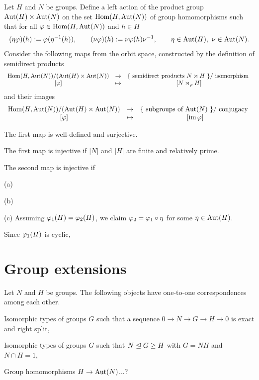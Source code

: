 \documentclass{../../large}
\begin{document}
\begin{prb}
Let $H$ and $N$ be groups.
Define a left action of the product group $\operatorname{Aut}(H)\times\operatorname{Aut}(N)$ on the set $\operatorname{Hom}(H,\operatorname{Aut}(N))$ of group homomorphisms such that for all $\varphi\in\operatorname{Hom}(H,\operatorname{Aut}(N))$ and $h\in H$
\[(\eta\varphi)(h):=\varphi(\eta^{-1}(h)),\qquad(\nu\varphi)(h):=\nu\varphi(h)\nu^{-1},\qquad \eta\in\operatorname{Aut}(H),\ \nu\in\operatorname{Aut}(N).\]
Consider the following maps from the orbit space, constructed by the definition of semidirect products
\[\begin{array}{ccc}
\operatorname{Hom}(H,\operatorname{Aut}(N))/(\operatorname{Aut}(H)\times\operatorname{Aut}(N))
&\to&
\{\text{ semidirect products $N\rtimes H$ }\}/\text{ isomorphism }\\
{[\varphi]}&\mapsto&{[N\rtimes_\varphi H]}
\end{array}\]
and their images
\[\begin{array}{ccc}
\operatorname{Hom}(H,\operatorname{Aut}(N))/(\operatorname{Aut}(H)\times\operatorname{Aut}(N))
&\to&
\{\text{ subgroups of $\operatorname{Aut}(N)$ }\}/\text{ conjugacy }\\
{[\varphi]}&\mapsto&{[\operatorname{im}\varphi]}
\end{array}\]
\begin{parts}
\item The first map is well-defined and surjective.
\item The first map is injective if $|N|$ and $|H|$ are finite and relatively prime.
\item The second map is injective if
\end{parts}
\end{prb}
\begin{pf}
(a)

(b)

(c)
Assuming $\varphi_1(H)=\varphi_2(H)$, we claim $\varphi_2=\varphi_1\circ\eta$ for some $\eta\in\operatorname{Aut}(H)$.

Since $\varphi_1(H)$ is cyclic, 
\end{pf}



\section{Group extensions}

\begin{prb}
Let $N$ and $H$ be groups.
The following objects have one-to-one correspondences among each other.
\begin{parts}
\item Isomorphic types of groups $G$ such that a sequence $0\to N\to G \to H\to 0$ is exact and right split,
\item Isomorphic types of groups $G$ such that $N\trianglelefteq G\ge H$ with $G=NH$ and $N\cap H=1$,
\item Group homomorphisms $H\to\operatorname{Aut}(N)$...?
\end{parts}
\end{prb}
\end{document}
